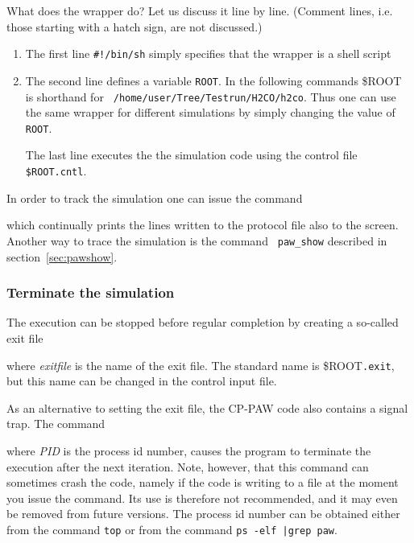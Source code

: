 \documentclass[final,12pt]{article}
\begin{document}
What does the wrapper do? Let us discuss it line by line. (Comment
lines, i.e. those starting with a hatch sign, are not discussed.)
\begin{enumerate}
\item The first line {\tt \#!/bin/sh} simply specifies that the
  wrapper is a shell script
\item The second line defines a variable {\tt ROOT}. In the following
  commands \${ROOT} is shorthand for {\tt
  /home/user/Tree/Testrun/H2CO/h2co}. Thus one can use the same
  wrapper for different simulations by simply changing the value of
  {\tt ROOT}.
\begin{sloppypar}
  The last line executes the the simulation code using the control
  file {\tt \${ROOT}.cntl}. 
\end{sloppypar}
\end{enumerate}

In order to track the simulation one can issue the command

\bigskip{}\bigskip

which continually prints the lines written to the protocol file also
to the screen. Another way to trace the simulation is the command {\tt
paw\_show} described in section~\ref{sec:pawshow}.


\subsubsection{Terminate the simulation}

The execution can be stopped before regular completion by creating a
so-called exit file

\bigskip{}\bigskip

\noindent where {\it exitfile} is the name of the exit file. 
The standard name is \$ROOT{\tt .exit}, but this name can be changed
in the control input file.

As an alternative to setting the exit file, the CP-PAW code also contains
a signal trap. The command

\bigskip{}\bigskip

\noindent where {\it PID} is the process id number, causes the program
to terminate the execution after the next iteration. Note, however,
that this command can sometimes crash the code, namely if the code is
writing to a file at the moment you issue the command.  Its use is
therefore not recommended, and it may even be removed from future
versions. The process id number can be obtained either from the
command \verb|top| or from the command \verb+ps -elf |grep paw+.
\end{document}
